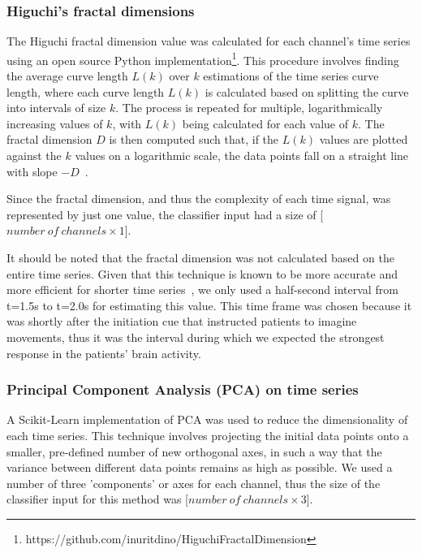 \documentclass{mpaper}
\begin{document}
\subsubsection{Higuchi's fractal dimensions}

The Higuchi fractal dimension value was calculated for each channel's time series using an open source Python implementation\footnote{https://github.com/inuritdino/HiguchiFractalDimension}. This procedure involves finding the average curve length $L(k)$ over $k$ estimations of the time series curve length, where each curve length $L(k)$ is calculated based on splitting the curve into intervals of size $k$. The process is repeated for multiple, logarithmically increasing values of $k$, with $L(k)$ being calculated for each value of $k$. The fractal dimension $D$ is then computed such that, if the $L(k)$ values are plotted against the $k$ values on a logarithmic scale, the data points fall on a straight line with slope $-D$~\cite{higuchi_approach_1988}.

Since the fractal dimension, and thus the complexity of each time signal, was represented by just one value, the classifier input had a size of [\( number\ of\ channels \times 1 \)].

It should be noted that the fractal dimension was not calculated based on the entire time series. Given that this technique is known to be more accurate and more efficient for shorter time series~\cite{kesic_application_2016}, we only used a half-second interval from t=1.5s to t=2.0s for estimating this value. This time frame was chosen because it was shortly after the initiation cue that instructed patients to imagine movements, thus it was the interval during which we expected the strongest response in the patients' brain activity.

\subsubsection{Principal Component Analysis (PCA) on time series}
\label{pca-method}

A Scikit-Learn implementation of PCA was used to reduce the dimensionality of each time series. This technique involves projecting the initial data points onto a smaller, pre-defined number of new orthogonal axes, in such a way that the variance between different data points remains as high as possible. We used a number of three 'components' or axes for each channel, thus the size of the classifier input for this method was [\( number\ of\ channels \times 3 \)].
\end{document}
